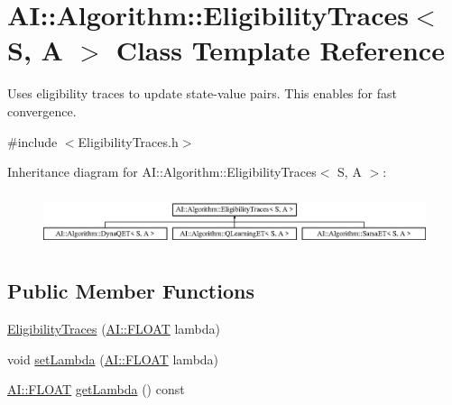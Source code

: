 \hypertarget{classAI_1_1Algorithm_1_1EligibilityTraces}{\section{A\-I\-:\-:Algorithm\-:\-:Eligibility\-Traces$<$ S, A $>$ Class Template Reference}
\label{classAI_1_1Algorithm_1_1EligibilityTraces}
}


Uses eligibility traces to update state-\/value pairs. This enables for fast convergence.  




{\ttfamily \#include $<$Eligibility\-Traces.\-h$>$}

Inheritance diagram for A\-I\-:\-:Algorithm\-:\-:Eligibility\-Traces$<$ S, A $>$\-:\begin{figure}[H]
\begin{center}
\leavevmode
\includegraphics[height=1.581921cm]{classAI_1_1Algorithm_1_1EligibilityTraces}
\end{center}
\end{figure}
\subsection*{Public Member Functions}
\begin{DoxyCompactItemize}
\item 
\hyperlink{classAI_1_1Algorithm_1_1EligibilityTraces_a5ee88e5ac3059733c38a95dba54f677d}{Eligibility\-Traces} (\hyperlink{namespaceAI_a41b74884a20833db653dded3918e05c3}{A\-I\-::\-F\-L\-O\-A\-T} lambda)
\item 
void \hyperlink{classAI_1_1Algorithm_1_1EligibilityTraces_ac52edaa0eeaf4446edb14f7b5415819f}{set\-Lambda} (\hyperlink{namespaceAI_a41b74884a20833db653dded3918e05c3}{A\-I\-::\-F\-L\-O\-A\-T} lambda)
\item 
\hyperlink{namespaceAI_a41b74884a20833db653dded3918e05c3}{A\-I\-::\-F\-L\-O\-A\-T} \hyperlink{classAI_1_1Algorithm_1_1EligibilityTraces_aea9a2c36874a3df328efdf4077ea1c19}{get\-Lambda} () const 
\end{DoxyCompactItemize}
